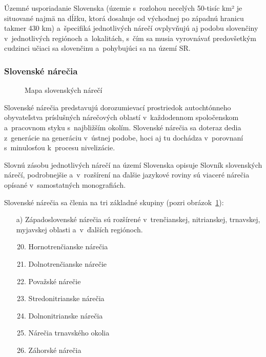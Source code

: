 \begin{multicols}{2}
Územné usporiadanie Slovenska (územie s~rozlohou necelých 50-tisíc km² je situované najmä na dĺžku, ktorá dosahuje od východnej po západnú hranicu takmer 430 km) a~špecifiká jednotlivých nárečí ovplyvňujú aj podobu slovenčiny v~jednotlivých regiónoch a~lokalitách, s~čím sa musia vyrovnávať predovšetkým cudzinci učiaci sa slovenčinu a~pohybujúci sa na území SR.

\subsubsection{Slovenské nárečia}
\begin{figure}[ht]
\centering
\def\svgwidth{\textwidth}

\caption{%
Mapa slovenských nárečí
}
\label{fig:dialects_sk}
\end{figure}

Slovenské nárečia predstavujú dorozumievací prostriedok autochtónneho obyvateľstva príslušných nárečových oblastí v~každodennom spoločenskom a~pracovnom styku s~najbližším okolím. Slovenské nárečia sa doteraz dedia z~generácie na generáciu v~ústnej podobe, hoci aj tu dochádza v~porovnaní s~minulosťou k~procesu nivelizácie.

Slovnú zásobu jednotlivých nárečí na území Slovenska opisuje Slovník slovenských nárečí, podrobnejšie a~v~rozšírení na ďalšie jazykové roviny sú viaceré nárečia opísané v~samostatných monografiách.

Slovenské nárečia sa členia na tri základné skupiny (pozri obrázok~\ref{fig:dialects_sk}):

\begin{itemize}
\item[a)] Západoslovenské nárečia sú rozšírené v~trenčianskej, nitrianskej, trnavskej, myjavskej oblasti a~v~ďalších regiónoch.

\begin{enumerate}
\setcounter{enumi}{19}
\item Hornotrenčianske nárečia
\item Dolnotrenčianske nárečie
\item Považské nárečie 
\item Stredonitrianske nárečia 
\item Dolnonitrianske nárečia 
\item Nárečia trnavského okolia
\item Záhorské nárečia 
\end{enumerate}


\end{itemize}
\end{multicols}
